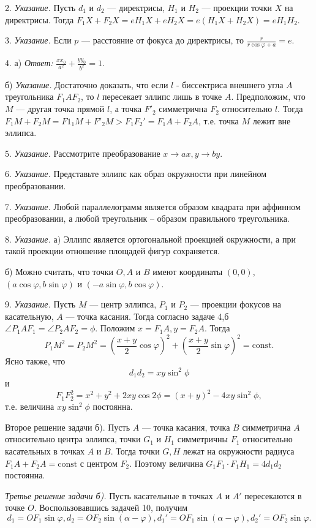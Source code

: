 2. \textit{Указание.} Пусть $d_1$ и $d_2$ — директрисы, $H_1$ и $H_2$ — проекции точки $X$ на директрисы. Тогда $F_1X + F_2X = eH_1X + eH_2X = e(H_1X + H_2X) = e H_1 H_2$.

3. \textit{Указание.} Если $p$ — расстояние от фокуса до директрисы, то $\frac{r}{r \cos\varphi + a} = e$.

4. а) \textit{Ответ:} $\frac{xx_0}{a^2} + \frac{y y_0}{b^2} = 1.$

б) \textit{Указание.} Достаточно доказать, что если $l$ - биссектриса внешнего угла $A$ треугольника $F_1AF_2$, то $l$ пересекает эллипс лишь в точке $A$. Предположим, что $M$ — другая точка прямой $l$, а точка $F'_2$ симметрична $F_2$ относительно $l$. Тогда $F_1M + F_2M = F1_1M + F'_2M > F_1F_2' = F_1A + F_2A$, т.е. точка $M$ лежит вне эллипса.

5. \textit{Указание.} Рассмотрите преобразование $x \to ax, y \to by$.

6. \textit{Указание.} Представьте эллипс как образ окружности при линейном преобразовании.

7. \textit{Указание.} Любой параллелограмм является образом квадрата при аффинном преобразовании, а любой треугольник -- образом правильного треугольника.

8. \textit{Указание.} а) Эллипс является ортогональной проекцией окружности, а при такой проекции отношение площадей фигур сохраняется.

б) Можно считать, что точки $O, A$ и $B$ имеют координаты $(0, 0)$, $(a \cos\varphi, b\sin\varphi)$ и $(-a\sin\varphi, b\cos\varphi)$.


9. \textit{Указание.} Пусть $M$ — центр эллипса, $P_1$ и $P_2$ — проекции фокусов на касательную, $A$ — точка касания. Тогда согласно задаче 4,б $\angle P_1 A F_1 = \angle P_2 A F_2 = \phi$. Положим $x = F_1 A, y = F_2 A$. Тогда
\[
	P_1M^2 = P_2M^2 = (\frac{x+y}{2} \cos\varphi)^2 + (\frac{x+y}{2}\sin\varphi)^2 = \text{const}.
\]
Ясно также, что
\[
	d_1 d_2 = xy \sin^2 \phi
\]
и
\[
	F_1 F_2^2 = x^2 + y^2 + 2xy \cos 2\phi = (x + y)^2 - 4xy \sin^2 \phi,
\]
т.е. величина $xy \sin^2 \phi$ постоянна. 

Второе решение задачи б). Пусть $A$ — точка касания, точка $B$ симметрична $A$ относительно центра эллипса, точки $G_1$ и $H_1$ симметричны $F_1$ относительно касательных в точках $A$ и $B$. Тогда точки $G, H$ лежат на окружности радиуса $F_1 A + F_2 A = \text{const}$ с центром $F_2$. Поэтому величина $G_1 F_1 \cdot F_1 H_1 = 4d_1 d_2$ постоянна.

\textit{Третье решение задачи б).} Пусть касательные в точках $A$ и $A'$ пересекаются в точке $O$. Воспользовавшись задачей 10, получим
\[
	d_1 = OF_1 \sin \varphi, d_2 = OF_2 \sin(\alpha - \varphi), d_1' = OF_1 \sin(\alpha - \varphi), d_2' = OF_2 \sin \varphi.
\]

